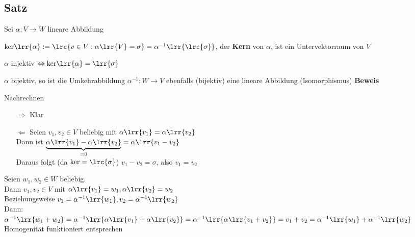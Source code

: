 \subsection{Satz}
	Sei $\alpha:V\rightarrow W$ lineare Abbildung
		\item $\mbox{ker}\lrr{\alpha}:=\lrc{v\in V:\alpha\lrr{V}=\sigma}=\alpha^{-1}\lrr{\lrc{\sigma}}$, der \textbf{Kern} von $\alpha$, ist ein Untervektorraum von $V$
		\item $\alpha$ injektiv $\Leftrightarrow\mbox{ker}\lrr{\alpha}=\lrr{\sigma}$
		\item $\alpha$ bijektiv, so ist die Umkehrabbildung $\alpha^{-1}:W\rightarrow V$ ebenfalls (bijektiv) eine lineare Abbildung (Isomorphismus)
	\subExEnd
	\textbf{Beweis}
		\item Nachrechnen
		\item
			\begin{enumerate}
				\item[$\Rightarrow$] Klar
				\item[$\Leftarrow$] Seien $v_1,v_2\in V$ beliebig mit $\alpha\lrr{v_1}=\alpha\lrr{v_2}$\\
					Dann ist $\underbrace{\alpha\lrr{v_1}-\alpha\lrr{v_2}}_{\scriptstyle =0}=\alpha\lrr{v_1-v_2}$\\
					Daraus folgt (da $\mbox{ker}=\lrc{\sigma}$) $v_1-v_2=\sigma$, also $v_1=v_2$
			\end{enumerate}
		\item Seien $w_1,w_2\in W$ beliebig.\\
			Dann $v_1,v_2\in V$ mit $\alpha\lrr{v_1}=w_1,\alpha\lrr{v_2}=w_2$\\
			Beziehungsweise $v_1=\alpha^{-1}\lrr{w_1}, v_2=\alpha^{-1}\lrr{w_2}$\\
			Dann:\\
			$\alpha^{-1}\lrr{w_1+w_2}=\alpha^{-1}\lrr{\alpha\lrr{v_1}+\alpha\lrr{v_2}}=\alpha^{-1}\lrr{\alpha\lrr{v_1+v_2}}=v_1+v_2=
			\alpha^{-1}\lrr{w_1}+\alpha^{-1}\lrr{w_2}$\\
			Homogenität funktioniert entsprechen
	\subExEnd
	
